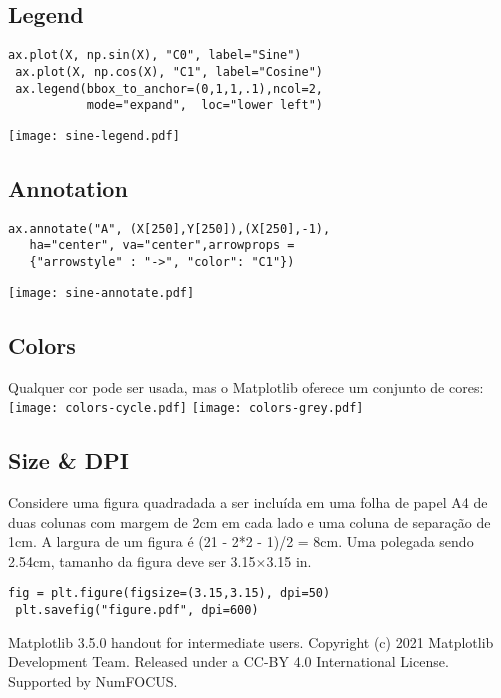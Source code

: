 \documentclass[10pt,landscape,a4paper]{article}
\begin{document}
\begin{multicols*}{3}
\subsection*{\rmfamily Legend}
\begin{lstlisting}[]
 ax.plot(X, np.sin(X), "C0", label="Sine")
 ax.plot(X, np.cos(X), "C1", label="Cosine")
 ax.legend(bbox_to_anchor=(0,1,1,.1),ncol=2,
           mode="expand",  loc="lower left")
\end{lstlisting}
\texttt{[image: sine-legend.pdf]}

\subsection*{\rmfamily Annotation}
\begin{lstlisting}[]
 ax.annotate("A", (X[250],Y[250]),(X[250],-1),
   ha="center", va="center",arrowprops =
   {"arrowstyle" : "->", "color": "C1"})
\end{lstlisting}
\texttt{[image: sine-annotate.pdf]}

\subsection*{\rmfamily Colors}

Qualquer cor pode ser usada, mas o Matplotlib oferece um conjunto de cores:\\
\texttt{[image: colors-cycle.pdf]} \smallskip
\texttt{[image: colors-grey.pdf]}\\

\vspace{-1em}
\subsection*{\rmfamily Size \& DPI}

Considere uma figura quadradada a ser incluída em uma folha de papel A4 de duas colunas com
margem de 2cm em cada lado e uma coluna de separação de 1cm. A largura de um figura é
(21 - 2*2 - 1)/2 = 8cm. Uma polegada sendo 2.54cm, tamanho da figura deve ser
3.15$\times$3.15 in.
\begin{lstlisting}[]
 fig = plt.figure(figsize=(3.15,3.15), dpi=50)
 plt.savefig("figure.pdf", dpi=600)
\end{lstlisting}


\vfill
%
{\scriptsize
  Matplotlib 3.5.0 handout for intermediate users.
  Copyright (c) 2021 Matplotlib Development Team.
  Released under a CC-BY 4.0 International License.
  Supported by NumFOCUS.
\par}



\end{multicols*}
\end{document}
